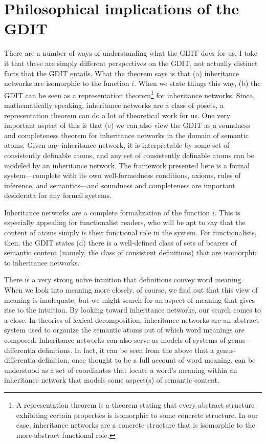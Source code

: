 \section{Philosophical implications of the GDIT}\label{sec2}

There are a number of ways of understanding what the GDIT does for us. I take it that these are simply different perspectives on the GDIT, not actually distinct facts that the GDIT entails. What the theorem says is that (a) inheritance networks are isomorphic to the function $i$. When we state things this way, (b) the GDIT can be seen as a representation theorem\footnote{A representation theorem is a theorem stating that every abstract structure exhibiting certain properties is isomorphic to some concrete structure. In our case, inheritance networks are a concrete structure that is isomorphic to the more-abstract functional role.} for inheritance networks. Since, mathematically speaking, inheritance networks are a class of posets, a representation theorem can do a lot of theoretical work for us. One very important aspect of this is that (c) we can also view the GDIT as a soundness and completeness theorem for inheritance networks in the domain of semantic atoms. Given any inheritance network, it is interpretable by some set of consistently definable atoms, and any set of consistently definable atoms can be modeled by an inheritance network. The framework presented here is a formal system---complete with its own well-formedness conditions, axioms, rules of inference, and semantics---and soundness and completeness are important desiderata for any formal systems.

Inheritance networks are a complete formalization of the function $i$. This is especially appealing for functionalist readers, who will be apt to say that the content of atoms simply is their functional role in the system. For functionalists, then, the GDIT states (d) there is a well-defined class of sets of bearers of semantic content (namely, the class of consistent definitions) that are isomorphic to inheritance networks.

There is a very strong na\"ive intuition that definitions convey word meaning. When we look into meaning more closely, of course, we find out that this view of meaning is inadequate, but we might search for an aspect of meaning that gives rise to the intuition. By looking toward inheritance networks, our search comes to a close. In theories of lexical decomposition, inheritance networks are an abstract system used to organize the semantic atoms out of which word meanings are composed. Inheritance networks can also serve as models of systems of genus-differentia definitions. In fact, it can be seen from the above that a genus-differentia definition, once thought to be a full account of word meaning, can be understood as a set of coordinates that locate a word's meaning within an inheritance network that models some aspect(s) of semantic content.

